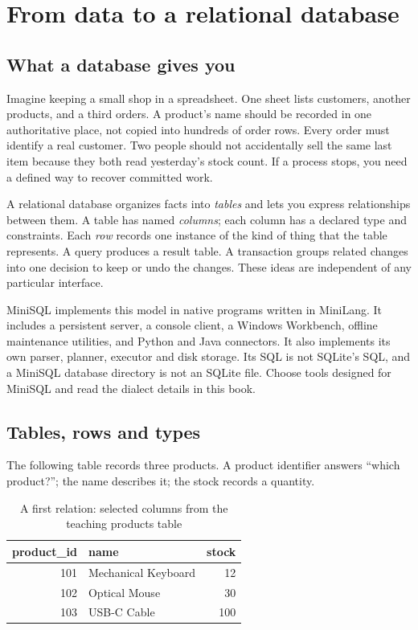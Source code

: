\chapter{From data to a relational database}
\label{learn:foundations}

\section{What a database gives you}
Imagine keeping a small shop in a spreadsheet. One sheet lists customers,
another products, and a third orders. A product's name should be recorded in
one authoritative place, not copied into hundreds of order rows. Every order
must identify a real customer. Two people should not accidentally sell the
same last item because they both read yesterday's stock count. If a process
stops, you need a defined way to recover committed work.

A relational database organizes facts into \emph{tables} and lets you express
relationships between them. A table has named \emph{columns}; each column has
a declared type and constraints. Each \emph{row} records one instance of the
kind of thing that the table represents. A query produces a result table.
A transaction groups related changes into one decision to keep or undo the
changes. These ideas are independent of any particular interface.

MiniSQL implements this model in native programs written in MiniLang. It
includes a persistent server, a console client, a Windows Workbench,
offline maintenance utilities, and Python and Java connectors. It also
implements its own parser, planner, executor and disk storage. Its SQL is
not SQLite's SQL, and a MiniSQL database directory is not an SQLite file.
Choose tools designed for MiniSQL and read the dialect details in this book.

\section{Tables, rows and types}
The following table records three products. A product identifier answers
``which product?''; the name describes it; the stock records a quantity.

\begin{table}[htbp]\centering
\caption{A first relation: selected columns from the teaching products table}
\begin{tabular}{r l r}\toprule
product\_id & name & stock\\\midrule
101 & Mechanical Keyboard & 12\\
102 & Optical Mouse & 30\\
103 & USB-C Cable & 100\\\bottomrule
\end{tabular}
\end{table}

